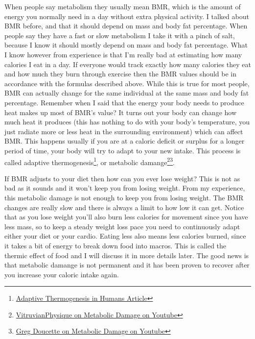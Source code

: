 \documentclass[openany, 12pt]{book}
\begin{document}
	When people say metabolism they usually mean BMR, which is the amount of energy you normally need in a day without extra physical activity. I talked about BMR before, and 
	that it should depend on mass and body fat percentage. When people say they have a fast or slow metabolism I take it with a pinch of salt, because I know it should mostly depend
        on mass and body fat percentage. What I know however from experience is that I'm really bad at estimating how many calories I eat in a day. If everyone would track exactly how
        many calories they eat and how much they burn through exercise then the BMR values should be in accordance with the formulas described above. While this is true for most people,
        BMR can actually change for the same individual at the same mass and body fat percentage. Remember when I said that the energy your body needs to produce heat makes up most of
        BMR's value? It turns out your body can change how much heat it produces (this has nothing to do with your body's temperature, you just radiate more or less heat in the surrounding
        environment) which can affect BMR. This happens usually if you are at a caloric deficit or surplus for a longer period of time, your body will try to adapt to your new intake. This
        process is called adaptive thermogenesis\footnote{\href{https://www.ncbi.nlm.nih.gov/pmc/articles/PMC3673773/}{Adaptive Thermogenesis in Humans Article}}, or
        metabolic damange\footnote{\href{https://www.youtube.com/watch?v=bLboowVr2DM}{VitruvianPhysique on Metabolic Damage on Youtube}}\footnote{\href{https://www.youtube.com/watch?v=VVF64oQ3yZk}{Greg Doucette on Metabolic Damage on Youtube}}.

        If BMR adjusts to your diet then how can you ever lose weight? This is not as bad as it sounds and it won't keep you from losing weight. From my experience, this metabolic damage is
        not enough to keep you from losing weight. The BMR changes are really slow and there is always a limit to how low it can get. Notice that as you lose weight you'll also burn less
        calories for movement since you have less mass, so to keep a steady weight loss pace you need to continuously adapt either your diet or your cardio. Eating less also means less
        calories burned, since it takes a bit of energy to break down food into macros. This is called the thermic effect of food and I will discuss it in more details later. The good news is that metabolic damange
        is not permanent and it has been proven to recover after you increase your caloric intake again.
\end{document}
